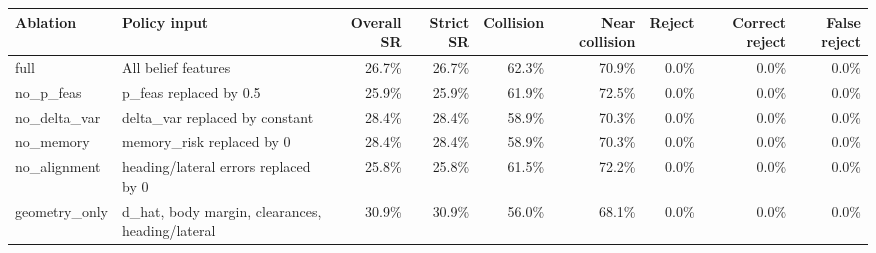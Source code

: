 \begin{tabular}{llrrrrrrr}
\toprule
Ablation & Policy input & Overall SR & Strict SR & Collision & Near collision & Reject & Correct reject & False reject \\
\midrule
full & All belief features & 26.7\% & 26.7\% & 62.3\% & 70.9\% & 0.0\% & 0.0\% & 0.0\% \\
no\_p\_feas & p\_feas replaced by 0.5 & 25.9\% & 25.9\% & 61.9\% & 72.5\% & 0.0\% & 0.0\% & 0.0\% \\
no\_delta\_var & delta\_var replaced by constant & 28.4\% & 28.4\% & 58.9\% & 70.3\% & 0.0\% & 0.0\% & 0.0\% \\
no\_memory & memory\_risk replaced by 0 & 28.4\% & 28.4\% & 58.9\% & 70.3\% & 0.0\% & 0.0\% & 0.0\% \\
no\_alignment & heading/lateral errors replaced by 0 & 25.8\% & 25.8\% & 61.5\% & 72.2\% & 0.0\% & 0.0\% & 0.0\% \\
geometry\_only & d\_hat, body margin, clearances, heading/lateral & 30.9\% & 30.9\% & 56.0\% & 68.1\% & 0.0\% & 0.0\% & 0.0\% \\
\bottomrule
\end{tabular}
